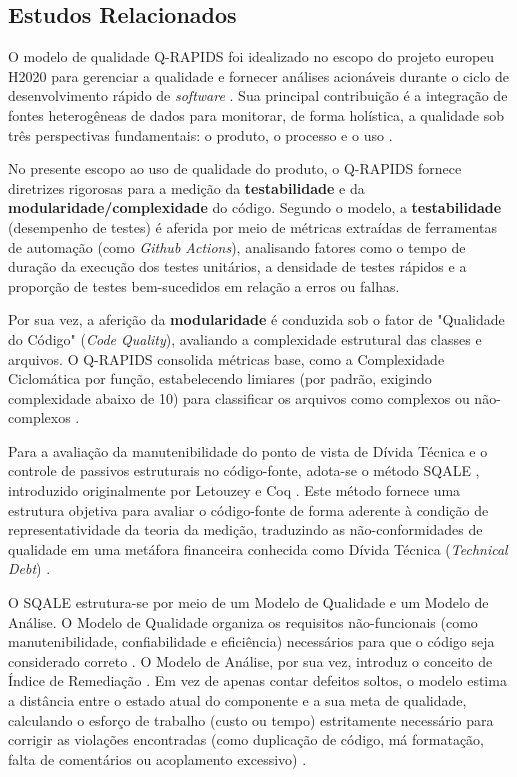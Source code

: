 \subsection{Estudos Relacionados}

O modelo de qualidade Q-RAPIDS foi idealizado no escopo do projeto europeu H2020 para gerenciar a qualidade e fornecer análises acionáveis durante o ciclo de desenvolvimento rápido de \textit{software} \cite{qrapids2019}. Sua principal contribuição é a integração de fontes heterogêneas de dados para monitorar, de forma holística, a qualidade sob três perspectivas fundamentais: o produto, o processo e o uso \cite{qrapids2019}.

No presente escopo ao uso de qualidade do produto, o Q-RAPIDS fornece diretrizes rigorosas para a medição da \textbf{testabilidade} e da \textbf{modularidade/complexidade} do código. Segundo o modelo, a \textbf{testabilidade} (desempenho de testes) é aferida por meio de métricas extraídas de ferramentas de automação (como \textit{Github Actions}), analisando fatores como o tempo de duração da execução dos testes unitários, a densidade de testes rápidos e a proporção de testes bem-sucedidos em relação a erros ou falhas.

Por sua vez, a aferição da \textbf{modularidade} é conduzida sob o fator de "Qualidade do Código" (\textit{Code Quality}), avaliando a complexidade estrutural das classes e arquivos. O Q-RAPIDS consolida métricas base, como a Complexidade Ciclomática por função, estabelecendo limiares (por padrão, exigindo complexidade abaixo de 10) para classificar os arquivos como complexos ou não-complexos \cite{qrapids2019}.

Para a avaliação da manutenibilidade do ponto de vista de Dívida Técnica e o controle de passivos estruturais no código-fonte, adota-se o método SQALE , introduzido originalmente por Letouzey e Coq \cite{letouzey2010}. Este método fornece uma estrutura objetiva para avaliar o código-fonte de forma aderente à condição de representatividade da teoria da medição, traduzindo as não-conformidades de qualidade em uma metáfora financeira conhecida como Dívida Técnica (\textit{Technical Debt}) \cite{letouzey2010}.

O SQALE estrutura-se por meio de um Modelo de Qualidade e um Modelo de Análise. O Modelo de Qualidade organiza os requisitos não-funcionais (como manutenibilidade, confiabilidade e eficiência) necessários para que o código seja considerado correto \cite{letouzey2010}. O Modelo de Análise, por sua vez, introduz o conceito de Índice de Remediação \cite{letouzey2010}. Em vez de apenas contar defeitos soltos, o modelo estima a distância entre o estado atual do componente e a sua meta de qualidade, calculando o esforço de trabalho (custo ou tempo) estritamente necessário para corrigir as violações encontradas (como duplicação de código, má formatação, falta de comentários ou acoplamento excessivo) \cite{letouzey2010}.

